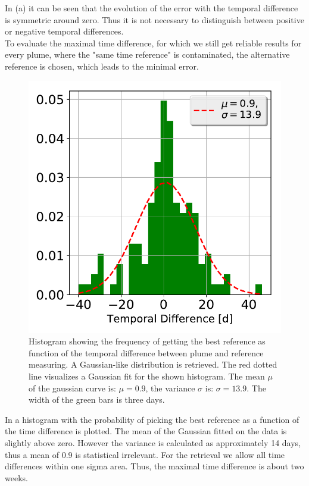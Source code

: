 %
In  (a) it can be seen that the evolution of the   error with the temporal difference is symmetric around zero. Thus it is not necessary to distinguish between positive or negative temporal differences.
\\
To evaluate the maximal time difference, for which we still get reliable results for every plume, where the "same time reference" is contaminated, the alternative reference is chosen, which leads to the minimal  error.\\
\begin{figure}
	\centering
	\includegraphics[width=0.6\linewidth]{Bilder/Hist}
	\caption{Histogram showing the frequency of getting the best reference as function of the temporal difference between plume and reference measuring. A Gaussian-like distribution is retrieved. The red dotted line visualizes a Gaussian fit for the shown histogram. The mean $\mu$ of the gaussian curve is: $\mu = 0.9$, the variance $\sigma$ is: $\sigma = 13.9$. The width of the green bars is three days.}
	\label{fig:Hist}
\end{figure}
%
In  a histogram with the probability of picking the best reference as a function of the time difference is plotted. The mean of the Gaussian fitted on the data is slightly above zero. However the variance is calculated as approximately 14 days, thus a mean of 0.9 is statistical irrelevant. For the retrieval we allow all time differences within one sigma area. Thus, the maximal time difference is about two weeks.\\

